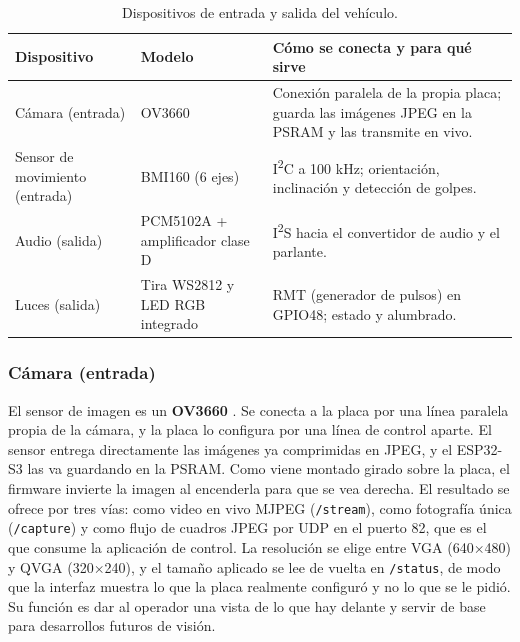\documentclass[journal]{IEEEtran}
\begin{document}
\begin{table}[htbp]
\centering
\caption{Dispositivos de entrada y salida del vehículo.}
\label{tab:io}
\small
\begin{tabular}{@{}>{\raggedright\arraybackslash}p{2.2cm}>{\raggedright\arraybackslash}p{1.9cm}>{\raggedright\arraybackslash}p{3.7cm}@{}}
\toprule
\textbf{Dispositivo} & \textbf{Modelo} & \textbf{Cómo se conecta y para qué sirve} \\
\midrule
Cámara (entrada) & OV3660 & Conexión paralela de la propia placa; guarda las imágenes JPEG en la PSRAM y las transmite en vivo. \\
\midrule
Sensor de movimiento (entrada) & BMI160 (6 ejes) & I\textsuperscript{2}C a 100 kHz; orientación, inclinación y detección de golpes. \\
\midrule
Audio (salida) & PCM5102A + amplificador clase D & I\textsuperscript{2}S hacia el convertidor de audio y el parlante. \\
\midrule
Luces (salida) & Tira WS2812 y LED RGB integrado & RMT (generador de pulsos) en GPIO48; estado y alumbrado. \\
\bottomrule
\end{tabular}
\end{table}

\subsubsection{Cámara (entrada)}
El sensor de imagen es un \textbf{OV3660} \cite{ov3660}. Se conecta a la placa por una línea paralela propia de la cámara, y la placa lo configura por una línea de control aparte. El sensor entrega directamente las imágenes ya comprimidas en JPEG, y el ESP32-S3 las va guardando en la PSRAM. Como viene montado girado sobre la placa, el firmware invierte la imagen al encenderla para que se vea derecha. El resultado se ofrece por tres vías: como video en vivo MJPEG (\texttt{/stream}), como fotografía única (\texttt{/capture}) y como flujo de cuadros JPEG por UDP en el puerto 82, que es el que consume la aplicación de control. La resolución se elige entre VGA (640$\times$480) y QVGA (320$\times$240), y el tamaño aplicado se lee de vuelta en \texttt{/status}, de modo que la interfaz muestra lo que la placa realmente configuró y no lo que se le pidió. Su función es dar al operador una vista de lo que hay delante y servir de base para desarrollos futuros de visión.
\end{document}
